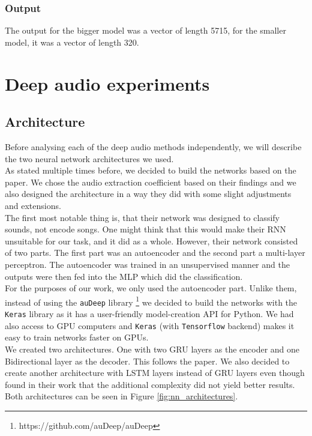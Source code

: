 \subsubsection{Output}
The output for the bigger model was a vector of length 5715, for the smaller model, it was a vector of length 320.

\section{Deep audio experiments}\label{sec:deep_audio_experiments}

\subsection{Architecture}\label{ssec:nn_architectures}
Before analysing each of the deep audio methods independently, we will describe the two neural network architectures we used. \\
As stated multiple times before, we decided to build the networks based on the \cite{inproceedings_RNNs} paper. We chose the audio extraction coefficient based on their findings and we also designed the architecture in a way they did with some slight adjustments and extensions. \\
The first most notable thing is, that their network was designed to classify sounds, not encode songs. One might think that this would make their RNN unsuitable for our task, and it did as a whole. However, their network consisted of two parts. The first part was an autoencoder and the second part a multi-layer perceptron. The autoencoder was trained in an unsupervised manner and the outputs were then fed into the MLP which did the classification. \\
For the purposes of our work, we only used the autoencoder part. Unlike them, instead of using the \texttt{auDeep} library \footnote{https://github.com/auDeep/auDeep} we decided to build the networks with the \texttt{Keras} library \cite{chollet2015keras} as it has a user-friendly model-creation API for Python. We had also access to GPU computers and \texttt{Keras} (with \texttt{Tensorflow} backend) makes it easy to train networks faster on GPUs. \\
We created two architectures. One with two GRU layers as the encoder and one Bidirectional layer as the decoder. This follows the paper. We also decided to create another architecture with LSTM layers instead of GRU layers even though \cite{inproceedings_RNNs} found in their work that the additional complexity did not yield better results. Both architectures can be seen in Figure \ref{fig:nn_architectures}. \\ 


